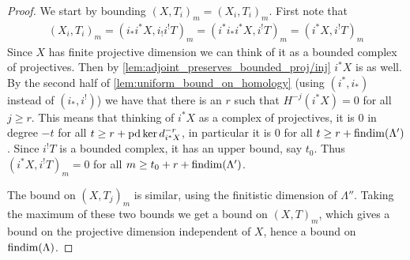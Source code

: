 \begin{theorem}
\begin{proof}
		We start by bounding $(X, T_i)_m = (X_i, T_i)_m$. First note that 
		\begin{align*}
			(X_i, T_i)_m = (i_*i^* X, i_!i^!T)_m = (i^*i_*i^* X, i^!T)_m = (i^* X, i^!T)_m
		\end{align*}
		Since $X$ has finite projective dimension we can think of it as a bounded complex of projectives. Then by \cref{lem:adjoint_preserves_bounded_proj/inj} $i^*X$ is as well. By the second half of \cref{lem:uniform_bound_on_homology} (using $(i^*, i_*)$ instead of $(i_*, i^!)$) we have that there is an $r$ such that $H^{-j}(i^*X)=0$ for all $j \geq r$. This means that thinking of $i^*X$ as a complex of projectives, it is 0 in degree $-t$ for all $t \geq r + \operatorname{pd}\ker d^{-r}_{i^*X}$, in particular it is 0 for all $t\geq r + \operatorname{findim}(\Lambda')$. Since $i^!T$ is a bounded complex, it has an upper bound, say $t_0$. Thus $(i^* X, i^!T)_m = 0$ for all $m \geq t_0 + r + \operatorname{findim}(\Lambda')$.
		
		The bound on $(X, T_j)_m$ is similar, using the finitistic dimension of $\Lambda''$. Taking the maximum of these two bounds we get a bound on $(X, T)_m$, which gives a bound on the projective dimension independent of $X$, hence a bound on $\operatorname{findim}(\Lambda)$. 
	\end{proof}
\end{theorem}